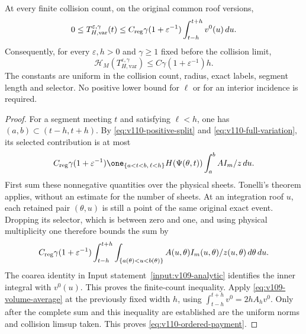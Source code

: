 \begin{theorem}
\label{thm:v110-payment}
At every finite collision count, on the original common roof versions,
\begin{equation}\label{eq:v110-finite-payment}
 0\le T_{H,\mathrm{var}}^{\varepsilon,\gamma}(t)
 \le C_{\rm reg}\gamma(1+\varepsilon^{-1})
                         \int_{t-h}^{t+h}v^0(u)\,du.
\end{equation}
Consequently, for every $\varepsilon,h>0$ and $\gamma\ge1$ fixed
before the collision limit,
\begin{equation}\label{eq:v110-ordered-payment}
 \mathcal H_M(T_{H,\mathrm{var}}^{\varepsilon,\gamma})
                  \le C\gamma(1+\varepsilon^{-1})h.
\end{equation}
The constants are uniform in the collision count, radius, exact
labels, segment length and selector. No positive lower bound for
$\ell$ or for an interior incidence is required.
\end{theorem}
\begin{proof}
For a segment meeting $t$ and satisfying $\ell<h$, one has
$(a,b)\subset(t-h,t+h)$. By \eqref{eq:v110-positive-split} and
\eqref{eq:v110-full-variation}, its selected contribution is at most
\[
 C_{\rm reg}\gamma(1+\varepsilon^{-1})
 \one_{\{a<t<b,\,\ell<h\}}H(\Psi(\theta,t))
             \int_a^b AI_m/z\,du.
\]
First sum these nonnegative quantities over the physical sheets.
Tonelli's theorem applies, without an estimate for the number of
sheets. At an integration roof $u$, each retained pair $(\theta,u)$
is still a point of the same original exact event. Dropping its
selector, which is between zero and one, and using physical
multiplicity one therefore bounds the sum by
\[
 C_{\rm reg}\gamma(1+\varepsilon^{-1})
 \int_{t-h}^{t+h}\int_{\{a(\theta)<u<b(\theta)\}}
              A(u,\theta)I_m(u,\theta)/z(u,\theta)\,d\theta\,du.
\]
The coarea identity in Input statement~\ref{input:v109-analytic}
identifies the inner integral with $v^0(u)$. This proves the
finite-count inequality. Apply \eqref{eq:v109-volume-average} at
the previously fixed width $h$, using
$\int_{t-h}^{t+h}v^0=2hA_hv^0$. Only after the complete sum and this
inequality are established are the uniform norms and collision
limsup taken. This proves \eqref{eq:v110-ordered-payment}.
\end{proof}

